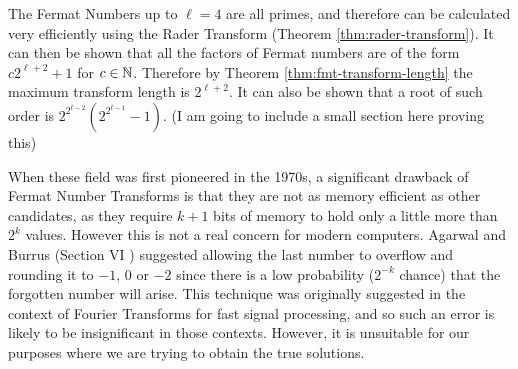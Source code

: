 The Fermat Numbers up to $\ell = 4$ are all primes, and therefore can be calculated very efficiently using the Rader Transform (Theorem \ref{thm:rader-transform}). It can then be shown \cite{intro-to-fmt} that all the factors of Fermat numbers are of the form $c2^{\ell + 2} + 1$ for $c \in {\mathbb N}$. Therefore by Theorem \ref{thm:fmt-transform-length} the maximum transform length is $2^{\ell + 2}$. It can also be shown that a root of such order is $2^{2^{t-2}}(2^{2^{t-1}} - 1)$.
(I am going to include a small section here proving this)

\medskip

When these field was first pioneered in the 1970s, a significant drawback of Fermat Number Transforms is that they are not as memory efficient as other candidates, as they require $k + 1$ bits of memory to hold only a little more than $2^k$ values. However this is not a real concern for modern computers. Agarwal and Burrus (Section VI \cite{intro-to-fmt}) suggested allowing the last number to overflow and rounding it to $\minus 1$, $0$ or $-2$ since there is a low probability ($2^{-k}$ chance) that the forgotten number will arise. This technique was originally suggested in the context of Fourier Transforms for fast signal processing, and so such an error is likely to be insignificant in those contexts. However, it is unsuitable for our purposes where we are trying to obtain the true solutions.

